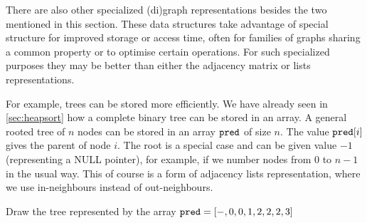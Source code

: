 There are also other specialized (di)graph representations besides the
two mentioned in this section.  These data structures take advantage of
special structure for improved storage or access time, often for
families of graphs sharing a common property or to optimise certain operations. For such specialized
purposes they may be better than either the adjacency matrix or lists
representations.

For example, trees can be stored more efficiently. We have already
seen in \cref{sec:heapsort} how a complete binary tree can be
stored in an array. A general rooted tree of $n$ nodes can be stored in
an array $\pred$ of size $n$. The value $\pred[i]$ gives the parent of
node $i$. The root is a special case and can be given value $-1$
(representing a NULL pointer), for example, if we number nodes from $0$
to $n-1$ in the usual way. This of course is a form of adjacency lists
representation, where we use in-neighbours instead of out-neighbours.

\begin{Boxample}[4]
Draw the tree represented by the array $\pred = [-,0,0,1,2,2,2,3]$
\end{Boxample}


